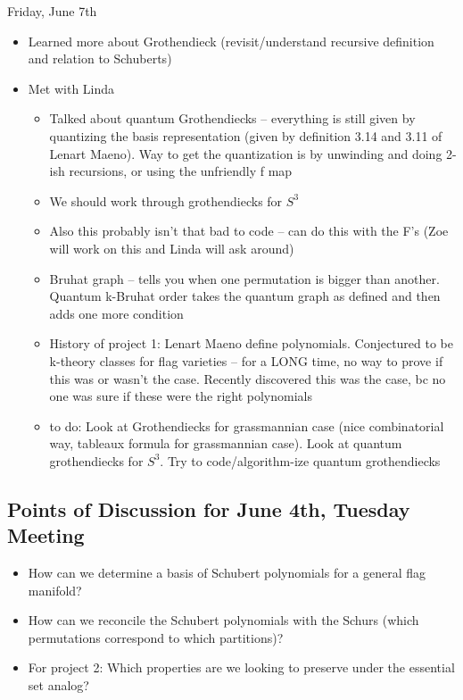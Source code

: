 Friday, June 7th
\begin{itemize}
    \item Learned more about Grothendieck (revisit/understand recursive definition and relation to Schuberts)
    \item Met with Linda
    \begin{itemize}
        \item Talked about quantum Grothendiecks -- everything is still given by quantizing the basis representation (given by definition 3.14 and 3.11 of Lenart Maeno). Way to get the quantization is by unwinding and doing 2-ish recursions, or using the unfriendly f map
        \item We should work through grothendiecks for $S^3$
        \item Also this probably isn't that bad to code -- can do this with the F's (Zoe will work on this and Linda will ask around)
        \item Bruhat graph -- tells you when one permutation is bigger than another. Quantum k-Bruhat order takes the quantum graph as defined and then adds one more condition
        \item History of project 1: Lenart Maeno define polynomials. Conjectured to be k-theory classes for flag varieties -- for a LONG time, no way to prove if this was or wasn't the case. Recently discovered this was the case, bc no one was sure if these were the right polynomials
        \item to do: Look at Grothendiecks for grassmannian case (nice combinatorial way, tableaux formula for grassmannian case). Look at quantum grothendiecks for $S^3$. Try to code/algorithm-ize quantum grothendiecks
    \end{itemize}
\end{itemize}

\subsection{Points of Discussion for June 4th, Tuesday Meeting}

\begin{itemize}
    \item How can we determine a basis of Schubert polynomials for a general flag manifold?
    \item How can we reconcile the Schubert polynomials with the Schurs (which permutations correspond to which partitions)?
    \item For project 2: Which properties are we looking to preserve under the essential set analog?
\end{itemize}

